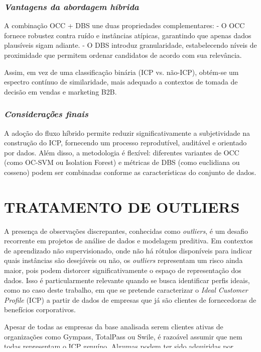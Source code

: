\subsubsection{\textit{Vantagens da abordagem híbrida}}

A combinação OCC + DBS une duas propriedades complementares:  
- O OCC fornece robustez contra ruído e instâncias atípicas, garantindo
que apenas dados plausíveis sigam adiante.  
- O DBS introduz granularidade, estabelecendo níveis de proximidade que
permitem ordenar candidatos de acordo com sua relevância.

Assim, em vez de uma classificação binária (ICP vs. não-ICP), obtém-se
um espectro contínuo de similaridade, mais adequado a contextos de
tomada de decisão em vendas e marketing B2B.

\subsubsection{\textit{Considerações finais}}

A adoção do fluxo híbrido permite reduzir significativamente a
subjetividade na construção do ICP, fornecendo um processo reprodutível,
auditável e orientado por dados. Além disso, a metodologia é flexível:
diferentes variantes de OCC (como OC-SVM ou Isolation Forest) e métricas
de DBS (como euclidiana ou cosseno) podem ser combinadas conforme as
características do conjunto de dados.



\section{TRATAMENTO DE OUTLIERS}

A presença de observações discrepantes, conhecidas como \textit{outliers}, é um desafio recorrente em projetos de análise de dados e modelagem preditiva. Em contextos de aprendizado não supervisionado, onde não há rótulos disponíveis para indicar quais instâncias são desejáveis ou não, os \textit{outliers} representam um risco ainda maior, pois podem distorcer significativamente o espaço de representação dos dados. Isso é particularmente relevante quando se busca identificar perfis ideais, como no caso deste trabalho, em que se pretende caracterizar o \textit{Ideal Customer Profile} (ICP) a partir de dados de empresas que já são clientes de fornecedoras de benefícios corporativos.

Apesar de todas as empresas da base analisada serem clientes ativas de organizações como Gympass, TotalPass ou Swile, é razoável assumir que nem todas representam o ICP genuíno. Algumas podem ter sido adquiridas por estratégias pontuais, por abordagens comerciais não direcionadas, ou ainda podem pertencer a segmentos fora do foco estratégico atual. A presença dessas observações pode comprometer a definição do que é o perfil ideal de cliente, especialmente em algoritmos sensíveis à densidade ou à distribuição das variáveis.

